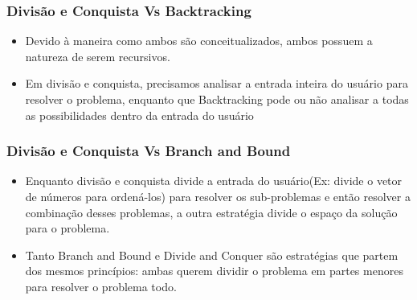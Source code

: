       \subsubsection{Divisão e Conquista Vs Backtracking}

      \begin{itemize}
          \item Devido à maneira como ambos são conceitualizados, ambos possuem a 
          natureza de serem recursivos.
          \item Em divisão e conquista, precisamos analisar a entrada inteira do usuário 
          para resolver o problema, enquanto que Backtracking pode ou não analisar a todas 
          as possibilidades dentro da entrada do usuário
      \end{itemize}

      \subsubsection{Divisão e Conquista Vs Branch and Bound}

      \begin{itemize}
          \item Enquanto divisão e conquista divide a entrada do usuário(Ex: divide o vetor de 
          números para ordená-los) para resolver os sub-problemas e então resolver a combinação
          desses problemas, a outra estratégia divide o espaço da solução para o problema.
          \item Tanto Branch and Bound e Divide and Conquer são estratégias que partem dos 
          mesmos princípios: ambas querem dividir o problema em partes menores para resolver 
          o problema todo.
      \end{itemize}

    \nocite{divide-and-conquer}
    \nocite{closest-pair-of-points}
\newpage